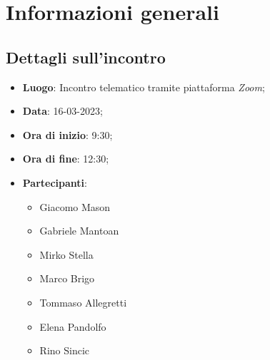 \section{Informazioni generali}

\subsection{Dettagli sull'incontro}
\begin{itemize}
\item \textbf{Luogo}: Incontro telematico tramite piattaforma \textit{Zoom};
\item \textbf{Data}: 16-03-2023;
\item \textbf{Ora di inizio}: 9:30;
\item \textbf{Ora di fine}: 12:30;
\item \textbf{Partecipanti}: 
\begin{itemize}
	\item Giacomo Mason
	\item Gabriele Mantoan
	\item Mirko Stella
	\item Marco Brigo
	\item Tommaso Allegretti
	\item Elena Pandolfo
	\item Rino Sincic
\end{itemize}
\end{itemize}